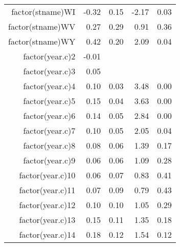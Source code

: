 \begin{table}[ht]
\begin{tabular}{rrrrr}
  factor(stname)WI & -0.32 & 0.15 & -2.17 & 0.03 \\ 
  factor(stname)WV & 0.27 & 0.29 & 0.91 & 0.36 \\ 
  factor(stname)WY & 0.42 & 0.20 & 2.09 & 0.04 \\ 
  factor(year.c)2 & -0.01 &  &  &  \\ 
  factor(year.c)3 & 0.05 &  &  &  \\ 
  factor(year.c)4 & 0.10 & 0.03 & 3.48 & 0.00 \\ 
  factor(year.c)5 & 0.15 & 0.04 & 3.63 & 0.00 \\ 
  factor(year.c)6 & 0.14 & 0.05 & 2.84 & 0.00 \\ 
  factor(year.c)7 & 0.10 & 0.05 & 2.05 & 0.04 \\ 
  factor(year.c)8 & 0.08 & 0.06 & 1.39 & 0.17 \\ 
  factor(year.c)9 & 0.06 & 0.06 & 1.09 & 0.28 \\ 
  factor(year.c)10 & 0.06 & 0.07 & 0.83 & 0.41 \\ 
  factor(year.c)11 & 0.07 & 0.09 & 0.79 & 0.43 \\ 
  factor(year.c)12 & 0.10 & 0.10 & 1.05 & 0.29 \\ 
  factor(year.c)13 & 0.15 & 0.11 & 1.35 & 0.18 \\ 
  factor(year.c)14 & 0.18 & 0.12 & 1.54 & 0.12 \\ 
   \hline
\end{tabular}
\end{table}
